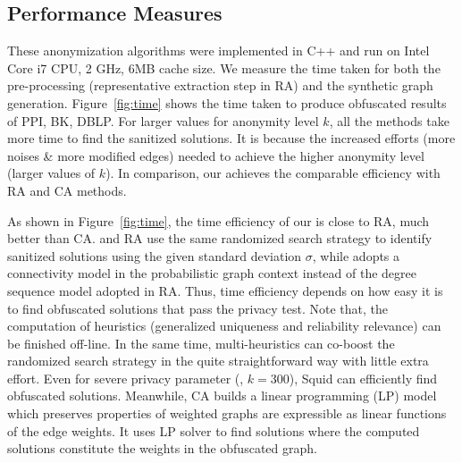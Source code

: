 \subsection{Performance Measures}
These anonymization algorithms were implemented in C++ and run on Intel Core i7 CPU, 2 GHz, 6MB cache size. We measure the time taken for both the pre-processing (representative extraction step in RA) and the synthetic graph generation. 
Figure~\ref{fig:time} shows the time taken to produce obfuscated results of PPI, BK, DBLP. 
For larger values for anonymity level $k$, all the methods take more time to find the sanitized solutions. It is because the increased efforts (more noises \& more modified edges) needed to achieve the higher anonymity level (larger values of $k$). 
In comparison, our {\methodName} achieves the comparable efficiency with RA and CA methods.  

As shown in Figure~\ref{fig:time}, the time efficiency of our {\methodName} is close to RA, much better than CA.
{\methodName} and RA use the same randomized search strategy to identify sanitized solutions using the given standard deviation $\sigma$, while {\methodName} adopts a connectivity model in the probabilistic graph context instead of the degree sequence model adopted in RA. 
Thus, time efficiency depends on how easy it is to find obfuscated solutions that pass the privacy test.  
Note that, the computation of heuristics (generalized uniqueness and reliability relevance) can be finished off-line. 
In the same time, multi-heuristics can co-boost the randomized search strategy in the quite straightforward way with little extra effort. 
Even for severe privacy parameter ({\eg}, $k=300$), Squid can efficiently find obfuscated solutions. 
Meanwhile, CA builds a linear programming (LP) model which preserves properties of weighted graphs are expressible as linear functions of the edge weights. It uses LP solver to find solutions where the computed solutions constitute the weights in the obfuscated graph. 






